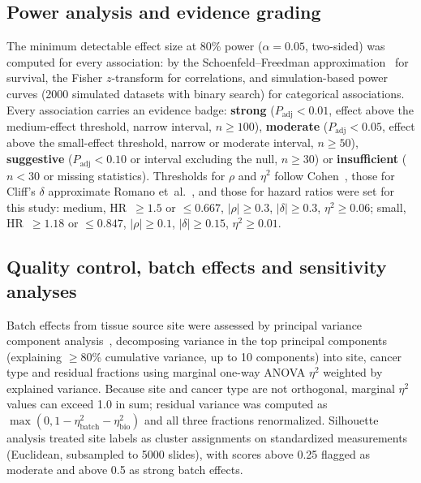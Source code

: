 \subsection{Power analysis and evidence grading}
\label{sec:methods:power}

The minimum detectable effect size at 80\% power ($\alpha = 0.05$, two-sided) was
computed for every association: by the Schoenfeld--Freedman
approximation~\cite{schoenfeld1983, freedman1982} for survival, the Fisher
$z$-transform for correlations, and simulation-based power curves (\num{2000}
simulated datasets with binary search) for categorical associations. Every
association carries an evidence badge: \textbf{strong} ($P_{\mathrm{adj}} <
0.01$, effect above the medium-effect threshold, narrow interval, $n \geq 100$),
\textbf{moderate} ($P_{\mathrm{adj}} < 0.05$, effect above the small-effect
threshold, narrow or moderate interval, $n \geq 50$), \textbf{suggestive}
($P_{\mathrm{adj}} < 0.10$ or interval excluding the null, $n \geq 30$) or
\textbf{insufficient} ($n < 30$ or missing statistics). Thresholds for $\rho$ and $\eta^2$ follow
Cohen~\cite{cohen1988}, those for Cliff's $\delta$ approximate Romano
et~al.~\cite{romano2006}, and those for hazard ratios were set for this study:
medium, HR~$\geq 1.5$ or
$\leq 0.667$, $|\rho| \geq 0.3$, $|\delta| \geq 0.3$, $\eta^2 \geq 0.06$; small,
HR~$\geq 1.18$ or $\leq 0.847$, $|\rho| \geq 0.1$, $|\delta| \geq 0.15$,
$\eta^2 \geq 0.01$.

\subsection{Quality control, batch effects and sensitivity analyses}
\label{sec:methods:qc}

Batch effects from tissue source site were assessed by principal variance
component analysis~\cite{li2009pvca}, decomposing variance in the top principal
components (explaining $\geq$80\% cumulative variance, up to 10 components) into
site, cancer type and residual fractions using marginal one-way ANOVA $\eta^2$
weighted by explained variance. Because site and cancer type are not orthogonal,
marginal $\eta^2$ values can exceed 1.0 in sum; residual variance was computed as
$\max(0, 1 - \eta^2_{\mathrm{batch}} - \eta^2_{\mathrm{bio}})$ and all three
fractions renormalized. Silhouette analysis treated site labels as cluster
assignments on standardized measurements (Euclidean, subsampled to \num{5000}
slides), with scores above 0.25 flagged as moderate and above 0.5 as strong batch
effects.

